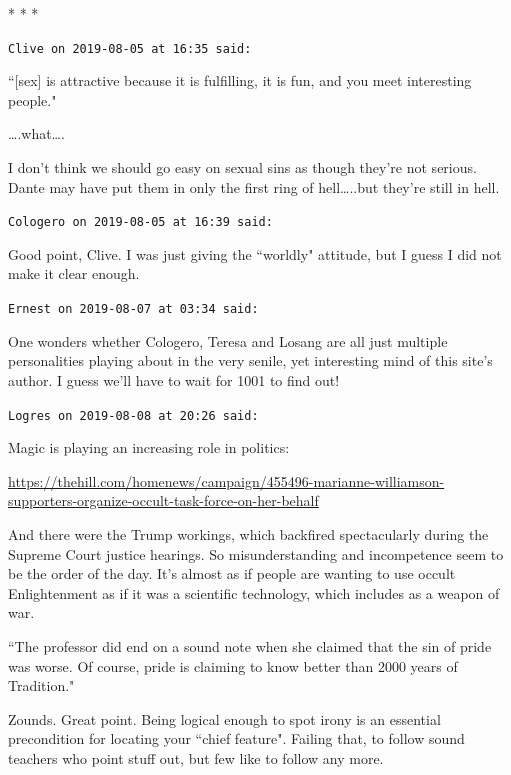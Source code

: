 
\begin{center}* * *\end{center}

\begin{footnotesize}\begin{sffamily}



\texttt{Clive on 2019-08-05 at 16:35 said: }

``[sex] is attractive because it is fulfilling, it is fun, and you meet interesting people."

….what….

I don't think we should go easy on sexual sins as though they're not serious. Dante may have put them in only the first ring of hell…..but they're still in hell.


\hfill

\texttt{Cologero on 2019-08-05 at 16:39 said: }

Good point, Clive. I was just giving the ``worldly" attitude, but I guess I did not make it clear enough.


\hfill

\texttt{Ernest on 2019-08-07 at 03:34 said: }

One wonders whether Cologero, Teresa and Losang are all just multiple personalities playing about in the very senile, yet interesting mind of this site's author. I guess we'll have to wait for 1001 to find out!


\hfill

\texttt{Logres on 2019-08-08 at 20:26 said: }

Magic is playing an increasing role in politics:

\url{https://thehill.com/homenews/campaign/455496-marianne-williamson-supporters-organize-occult-task-force-on-her-behalf}

And there were the Trump workings, which backfired spectacularly during the Supreme Court justice hearings. So misunderstanding and incompetence seem to be the order of the day. It's almost as if people are wanting to use occult Enlightenment as if it was a scientific technology, which includes as a weapon of war. 

``The professor did end on a sound note when she claimed that the sin of pride was worse. Of course, pride is claiming to know better than 2000 years of Tradition."

Zounds. Great point. Being logical enough to spot irony is an essential precondition for locating your ``chief feature". Failing that, to follow sound teachers who point stuff out, but few like to follow any more.


\end{sffamily}\end{footnotesize}
